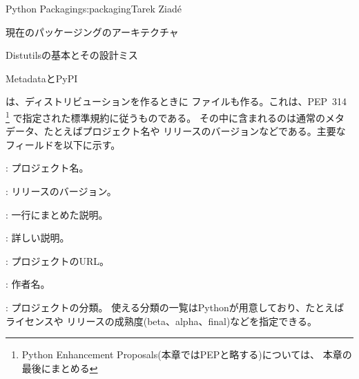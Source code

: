 \begin{aosachapter}{Python Packaging}{s:packaging}{Tarek Ziad\'{e}}
\begin{aosasect1}{現在のパッケージングのアーキテクチャ}
\begin{aosasect2}{Distutilsの基本とその設計ミス}
\end{aosasect2}

\begin{aosasect2}{MetadataとPyPI}

は、ディストリビューションを作るときに
ファイルも作る。これは、PEP~314
\footnote{Python Enhancement Proposals(本章ではPEPと略する)については、
本章の最後にまとめる}
で指定された標準規約に従うものである。
その中に含まれるのは通常のメタデータ、たとえばプロジェクト名や
リリースのバージョンなどである。主要なフィールドを以下に示す。

\begin{aosaitemize}

  \item {}: プロジェクト名。

  \item {}: リリースのバージョン。

  \item {}: 一行にまとめた説明。

  \item {}: 詳しい説明。

  \item {}: プロジェクトのURL。

  \item {}: 作者名。

  \item {}: プロジェクトの分類。
  使える分類の一覧はPythonが用意しており、たとえばライセンスや
  リリースの成熟度(beta、alpha、final)などを指定できる。


\end{aosaitemize}
\end{aosasect2}
\end{aosasect1}
\end{aosachapter}
